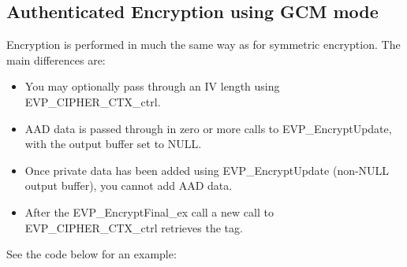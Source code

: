 \documentclass{article}
\begin{document}
\subsection{Authenticated Encryption using GCM mode}
Encryption is performed in much the same way as for symmetric encryption. The main differences are:
\begin{itemize}
\item You may optionally pass through an IV length using EVP\_CIPHER\_CTX\_ctrl.
\item AAD data is passed through in zero or more calls to EVP\_EncryptUpdate, with the output buffer set to NULL.
\item Once private data has been added using EVP\_EncryptUpdate (non-NULL output buffer), you cannot add AAD data.
\item After the EVP\_EncryptFinal\_ex call a new call to EVP\_CIPHER\_CTX\_ctrl retrieves the tag.
\end{itemize}
See the code below for an example:
\end{document}
